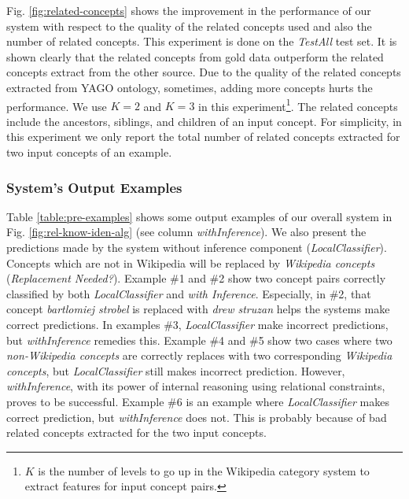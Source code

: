 Fig. \ref{fig:related-concepts} shows the improvement in the
performance of our system with respect to the quality of the related
concepts used and also the number of related concepts. This experiment
is done on the {\em TestAll} test set. It is shown clearly that the
related concepts from gold data outperform the related concepts
extract from the other source. Due to the quality of the related
concepts extracted from YAGO ontology, sometimes, adding more concepts
hurts the performance. We use $K=2$ and $K=3$ in this
experiment\footnote{$K$ is the number of levels to go up in the
  Wikipedia category system to extract features for input concept
  pairs.}. The related concepts include the ancestors, siblings, and
children of an input concept. For simplicity, in this experiment we
only report the total number of related concepts extracted for two
input concepts of an example.

\subsubsection{System's Output Examples}

Table \ref{table:pre-examples} shows some output examples of our
overall system in Fig. \ref{fig:rel-know-iden-alg} (see column {\em
  withInference}). We also present the predictions made by the system
without inference component ({\em LocalClassifier}). Concepts which
are not in Wikipedia will be replaced by {\em Wikipedia concepts}
({\em Replacement Needed?}). Example \#1 and \#2 show two concept pairs
correctly classified by both {\em LocalClassifier} and {\em with
  Inference}. Especially, in \#2, that concept {\em bartlomiej
  strobel} is replaced with {\em drew struzan} helps the systems make
correct predictions. In examples \#3, {\em LocalClassifier} make
incorrect predictions, but {\em withInference} remedies this. Example
\#4 and \#5 show two cases where two {\em non-Wikipedia concepts} are
correctly replaces with two corresponding {\em Wikipedia concepts},
but {\em LocalClassifier} still makes incorrect prediction. However,
{\em withInference}, with its power of internal reasoning using
relational constraints, proves to be successful. Example \#6 is an
example where {\em LocalClassifier} makes correct prediction, but {\em
  withInference} does not. This is probably because of bad related
concepts extracted for the two input concepts.

